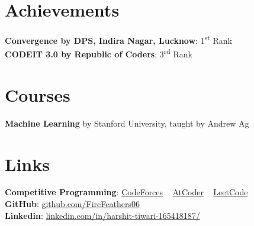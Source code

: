 \documentclass[margin, centered]{res}
\begin{document}
\begin{resume}
		
		\section{Achievements}
			\textbf{Convergence by DPS, Indira Nagar, Lucknow}: 1\textsuperscript{st} Rank\\
			\textbf{CODEIT 3.0 by Republic of Coders}: 3\textsuperscript{rd} Rank\\
		
		\section{Courses}
			\textbf{Machine Learning} by Stanford University, taught by Andrew Ag\\
		
		\section{Links}
			\textbf{Competitive Programming}:
			\href{https://codeforces.com/profile/FireFeatherz}{CodeForces}
			~
			\href{https://atcoder.jp/users/firefeathers}{AtCoder}
			~
			\href{https://leetcode.com/firefeathers/}{LeetCode}
			\\
			\textbf{GitHub}: \href{https://github.com/FireFeathers06}{github.com/FireFeathers06}
			\\
			\textbf{Linkedin}: \href{https://www.linkedin.com/in/harshit-tiwari-165418187/}{linkedin.com/in/harshit-tiwari-165418187/}
	\end{resume}
\end{document}
